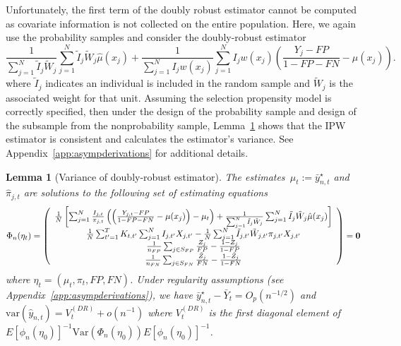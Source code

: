 \documentclass[11pt]{amsart}
\numberwithin{equation}{section}
\theoremstyle{plain}
\newtheorem{lemma}[theorem]{Lemma}
\begin{document}
Unfortunately, the first term of the doubly robust estimator cannot be computed as covariate information is not collected on the entire population.  Here, we again use the probability samples and consider the doubly-robust estimator
$$
\frac{1}{\sum_{j=1}^N \tilde I_j \tilde W_j} \sum_{j=1}^N  \tilde I_j \tilde W_j \hat \mu (x_j) + \frac{1}{\sum_{j=1}^N I_j w (x_j)} \sum_{j=1}^N I_j w(x_j) \left( \frac{Y_j - FP}{1 - FP - FN} - \mu(x_j) \right).
$$
where $\tilde I_j$ indicates an individual is included in the random sample and $\tilde W_j$ is the associated weight for that unit. Assuming the selection propensity model is correctly specified, then under the design of the probability sample and design of the subsample from the nonprobability sample, Lemma~\ref{lemma:dr} shows that the IPW estimator is  consistent and calculates the estimator's variance. See Appendix~\ref{app:asympderivations} for additional details.

\begin{lemma}[Variance of doubly-robust estimator] \normalfont
\label{lemma:dr}
The estimates~$\mu_t := \bar y_{n,t}^\star$ and $\hat \pi_{j,t}$
are solutions to the following set of estimating equations
$$
\Phi_n (\eta_t) =
\left (
\begin{array}{c}
\frac{1}{N} \left[ \sum_{j=1}^N \frac{I_{j,t}}{\pi_{j,t}} \left( \left( \frac{Y_{j,t} - FP}{1-FP-FN} - \mu(x_j)  \right)  - \mu_t \right) + \frac{1}{\sum_{j=1}^N \tilde I_j \tilde W_j} \sum_{j=1}^N  \tilde I_j \tilde W_j \hat \mu (x_j) \right] \\
\frac{1}{N} \sum_{t^\prime = 1}^T K_{t,t^\prime} \sum_{j=1}^N I_{j,t^\prime} X_{j,t^\prime} - \frac{1}{N} \sum_{j = 1}^N \tilde I_{j,t^\prime} \tilde W_{j,t^\prime}  \pi_{j,t^\prime} X_{j,t^\prime}  \\
\frac{1}{n_{FP}} \sum_{j \in S_{FP}} \frac{Z_j}{FP} - \frac{1-Z_j}{1-FP} \\
\frac{1}{n_{FN}} \sum_{j \in S_{FN}} \frac{\tilde Z_j}{FN} - \frac{1-\tilde Z_j}{1-FN} \\
\end{array}
\right ) = {\bf 0}
$$
where $\eta_t = (\mu_t, \pi_t, FP, FN)$. Under regularity assumptions (see Appendix~\ref{app:asympderivations}), we have $\bar y_{n,t}^\star - \bar Y_{t} = O_p (n^{-1/2})$ and $\text{var} (\hat y_{n,t}) = V_{t}^{(DR)} + o (n^{-1})$ where $V_t^{(DR)}$ is the first diagonal element of $E [\phi_n(\eta_0)]^{-1} \text{Var}(\Phi_n(\eta_0))E [\phi_n(\eta_0)]^{-1}$.
\end{lemma}
\end{document}
